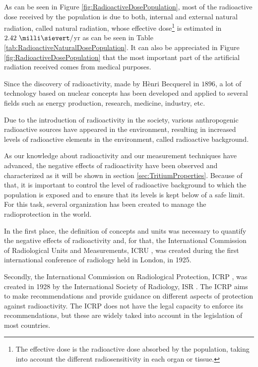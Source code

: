 As can be seen in Figure \ref{fig:RadioactiveDosePopulation}, most of the radioactive dose received by the population is due to both, internal and external natural radiation, called natural radiation, whose effective dose\footnote{The effective dose is the radioactive dose absorbed by the population, taking into account the different radiosensitivity in each organ or tissue.} is estimated in $2.42~\milli\sievert/$yr as can be seen in Table \ref{tab:RadioactiveNaturalDosePopulation}. It can also be appreciated in Figure \ref{fig:RadioactiveDosePopulation} that the most important part of the artificial radiation received comes from medical purposes. 

Since the discovery of radioactivity, made by Hènri Becquerel in $1896$, a lot of technology based on nuclear concepts has been developed and applied to several fields such as energy production, research, medicine, industry, etc. 

Due to the introduction of radioactivity in the society, various anthropogenic radioactive sources have appeared in the environment, resulting in increased levels of radioactive elements in the environment, called radioactive background. 

As our knowledge about radioactivity and our measurement techniques have advanced, the negative effects of radioactivity have been observed and characterized as it will be shown in section \ref{sec:TritiumProperties}. Because of that, it is important to control the level of radioactive background to which the population is exposed and to ensure that its levels is kept below of a safe limit. For this task, several organization has been created to manage the radioprotection in the world.

In the first place, the definition of concepts and units was necessary to quantify the negative effects of radioactivity and, for that, the International Commission of Radiological Units and Measurements, ICRU \cite{ICRU}, was created during the first international conference of radiology held in London, in 1925.

Secondly, the International Commission on Radiological Protection, ICRP \cite{ICRP}, was created in 1928 by the International Society of Radiology, ISR \cite{ISR}. The ICRP aims to make recommendations and provide guidance on different aspects of protection against radioactivity. The ICRP does not have the legal capacity to enforce its recommendations, but these are widely taked into account in the legislation of most countries. %

